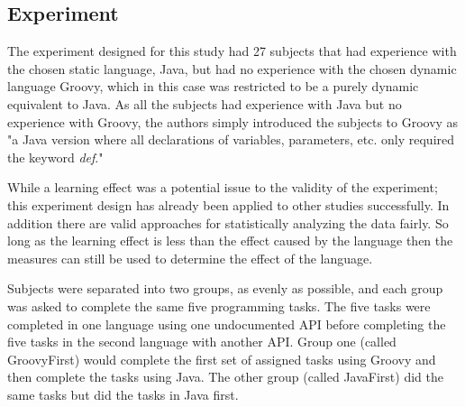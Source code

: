 \documentclass{sig-alternate}
\begin{document}
 
\subsection{Experiment}
The experiment designed for this study had 27 subjects that had  experience with the chosen static language, Java, but had no experience with the chosen dynamic language Groovy, which in this case was restricted to be a purely dynamic equivalent to Java. As all the subjects had experience with Java but no experience with Groovy, the authors simply introduced the subjects to Groovy as "a Java version where all declarations of variables, parameters, etc. only required the keyword \emph{def}." \cite{Mayer2012} 

While a learning effect was a potential issue to the validity of the experiment; this experiment design has already been applied to other studies successfully. In addition there are valid approaches for statistically analyzing the data fairly. So long as the learning effect is less than the effect caused by the language then the measures can still be used to determine the effect of the language.

Subjects were separated into two groups, as evenly as possible, and each group was asked to complete the same five programming tasks. The five tasks were completed in one language using one undocumented API before completing the five tasks in the second language with another API. Group one (called GroovyFirst) would complete the first set of assigned tasks using Groovy and then complete the tasks using Java. The other group (called JavaFirst) did the same tasks but did the tasks in Java first. 
\end{document}
